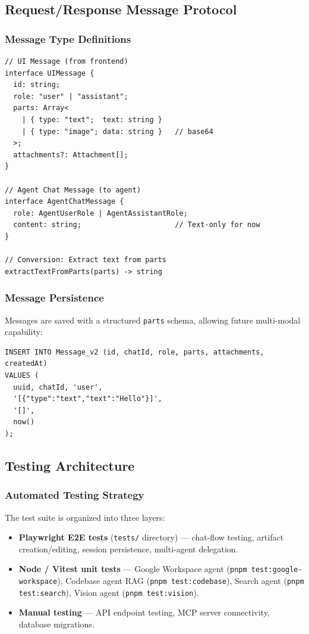 \documentclass[11pt,a4paper]{report}
\newcommand{\code}[1]{\texttt{\small #1}}
\begin{document}
\subsection{Request/Response Message Protocol}

\subsubsection{Message Type Definitions}

\begin{lstlisting}[style=tsstyle]
// UI Message (from frontend)
interface UIMessage {
  id: string;
  role: "user" | "assistant";
  parts: Array<
    | { type: "text";  text: string }
    | { type: "image"; data: string }   // base64
  >;
  attachments?: Attachment[];
}

// Agent Chat Message (to agent)
interface AgentChatMessage {
  role: AgentUserRole | AgentAssistantRole;
  content: string;                      // Text-only for now
}

// Conversion: Extract text from parts
extractTextFromParts(parts) -> string
\end{lstlisting}

\subsubsection{Message Persistence}

Messages are saved with a structured \code{parts} schema, allowing future multi-modal capability:

\begin{lstlisting}[style=shstyle]
INSERT INTO Message_v2 (id, chatId, role, parts, attachments, createdAt)
VALUES (
  uuid, chatId, 'user',
  '[{"type":"text","text":"Hello"}]',
  '[]',
  now()
);
\end{lstlisting}

\subsection{Testing Architecture}

\subsubsection{Automated Testing Strategy}

The test suite is organized into three layers:

\begin{itemize}
  \item \textbf{Playwright E2E tests} (\code{tests/} directory) --- chat-flow testing, artifact creation/editing, session persistence, multi-agent delegation.
  \item \textbf{Node / Vitest unit tests} --- Google Workspace agent (\code{pnpm test:google-workspace}), Codebase agent RAG (\code{pnpm test:codebase}), Search agent (\code{pnpm test:search}), Vision agent (\code{pnpm test:vision}).
  \item \textbf{Manual testing} --- API endpoint testing, MCP server connectivity, database migrations.
\end{itemize}
\end{document}

